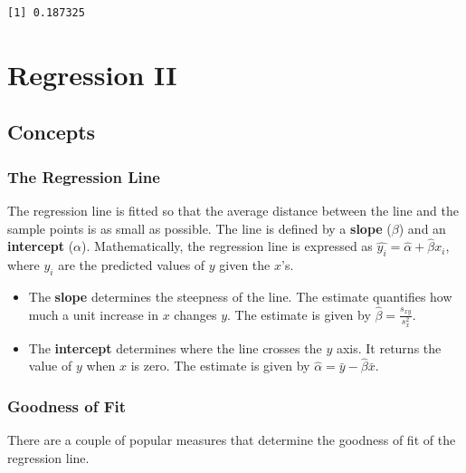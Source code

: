 \documentclass[
  letterpaper,
  DIV=11,
  numbers=noendperiod]{scrreprt}
\begin{document}
\begin{verbatim}
[1] 0.187325
\end{verbatim}

\hypertarget{regression-ii}{%
\chapter{Regression II}\label{regression-ii}}

\hypertarget{concepts-6}{%
\section{Concepts}\label{concepts-6}}

\hypertarget{the-regression-line}{%
\subsection*{The Regression Line}\label{the-regression-line}}

The regression line is fitted so that the average distance between the
line and the sample points is as small as possible. The line is defined
by a \textbf{slope} (\(\beta\)) and an \textbf{intercept} (\(\alpha\)).
Mathematically, the regression line is expressed as
\(\hat{y_i}=\hat{\alpha}+\hat{\beta}x_i\), where \(\hat{y_i}\) are the
predicted values of \(y\) given the \(x\)'s.

\begin{itemize}
\item
  The \textbf{slope} determines the steepness of the line. The estimate
  quantifies how much a unit increase in \(x\) changes \(y\). The
  estimate is given by \(\hat{\beta}= \frac {s_{xy}}{s_{x}^2}\).
\item
  The \textbf{intercept} determines where the line crosses the \(y\)
  axis. It returns the value of \(y\) when \(x\) is zero. The estimate
  is given by \(\hat{\alpha}=\bar{y}-\hat{\beta}\bar{x}\).
\end{itemize}

\hypertarget{goodness-of-fit}{%
\subsection*{Goodness of Fit}\label{goodness-of-fit}}

There are a couple of popular measures that determine the goodness of
fit of the regression line.
\end{document}
